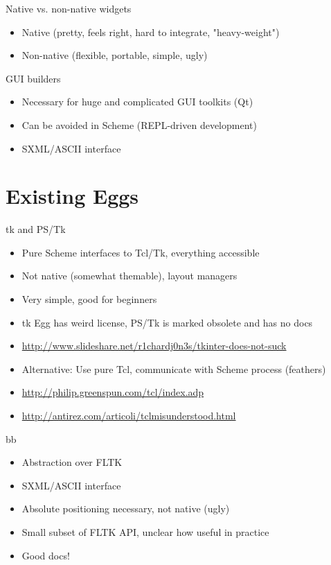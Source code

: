 \documentclass[presentation]{beamer}
\begin{document}
\begin{frame}[label=sec-2-4]{Native vs. non-native widgets}
\begin{itemize}
\item Native (pretty, feels right, hard to integrate, "heavy-weight")
\item Non-native (flexible, portable, simple, ugly)
\end{itemize}
\end{frame}

\begin{frame}[label=sec-2-5]{GUI builders}
\begin{itemize}
\item Necessary for huge and complicated GUI toolkits (Qt)
\item Can be avoided in Scheme (REPL-driven development)
\item SXML/ASCII interface
\end{itemize}
\end{frame}

\section{Existing Eggs}
\label{sec-3}

\begin{frame}[label=sec-3-1]{tk and PS/Tk}
\begin{itemize}
\item Pure Scheme interfaces to Tcl/Tk, everything accessible
\item Not native (somewhat themable), layout managers
\item Very simple, good for beginners
\item tk Egg has weird license, PS/Tk is marked obsolete and has no docs
\item \url{http://www.slideshare.net/r1chardj0n3s/tkinter-does-not-suck}
\item Alternative: Use pure Tcl, communicate with Scheme process (feathers)
\item \url{http://philip.greenspun.com/tcl/index.adp}
\item \url{http://antirez.com/articoli/tclmisunderstood.html}
\end{itemize}
\end{frame}

\begin{frame}[label=sec-3-2]{bb}
\begin{itemize}
\item Abstraction over FLTK
\item SXML/ASCII interface
\item Absolute positioning necessary, not native (ugly)
\item Small subset of FLTK API, unclear how useful in practice
\item Good docs!
\end{itemize}
\end{frame}
\end{document}
